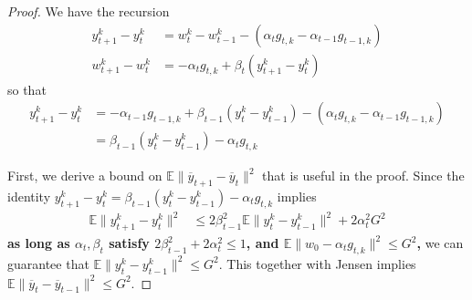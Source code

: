 \begin{proof}
We have the recursion 
\begin{align*}
y_{t+1}^{k}-y_{t}^{k} & =w_{t}^{k}-w_{t-1}^{k}-(\alpha_{t}g_{t,k}-\alpha_{t-1}g_{t-1,k})\\
w_{t+1}^{k}-w_{t}^{k} & =-\alpha_{t}g_{t,k}+\beta_{t}(y_{t+1}^{k}-y_{t}^{k})
\end{align*}
 so that 
\begin{align*}
y_{t+1}^{k}-y_{t}^{k} & =-\alpha_{t-1}g_{t-1,k}+\beta_{t-1}(y_{t}^{k}-y_{t-1}^{k})-(\alpha_{t}g_{t,k}-\alpha_{t-1}g_{t-1,k})\\
 & =\beta_{t-1}(y_{t}^{k}-y_{t-1}^{k})-\alpha_{t}g_{t,k}
\end{align*}

First, we derive a bound on $\mathbb{E}\|\overline{y}_{t+1}-\overline{y}_{t}\|^{2}$
that is useful in the proof. Since the identity $y_{t+1}^{k}-y_{t}^{k}=\beta_{t-1}(y_{t}^{k}-y_{t-1}^{k})-\alpha_{t}g_{t,k}$
implies 
\begin{align*}
\mathbb{E}\|y_{t+1}^{k}-y_{t}^{k}\|^{2} & \leq2\beta_{t-1}^{2}\mathbb{E}\|y_{t}^{k}-y_{t-1}^{k}\|^{2}+2\alpha_{t}^{2}G^{2}
\end{align*}
\textbf{as long as $\alpha_{t},\beta_{t}$ satisfy $2\beta_{t-1}^{2}+2\alpha_{t}^{2}\leq1$,
and $\mathbb{E}\|w_{0}-\alpha_{t}g_{t,k}\|^{2}\leq G^{2}$,} we can
guarantee that $\mathbb{E}\|y_{t}^{k}-y_{t-1}^{k}\|^{2}\leq G^{2}$.
This together with Jensen implies $\mathbb{E}\|\overline{y}_{t}-\overline{y}_{t-1}\|^{2}\leq G^{2}$. 


\end{proof}
